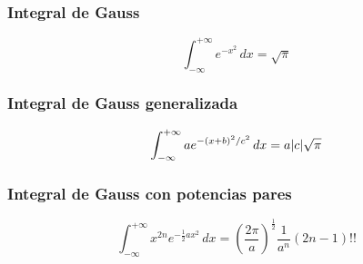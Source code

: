 \begin{summary}
    \subsubsection*{Integral de Gauss}
    \begin{equation}
        \label{eq:integral-gauss}
         \int_{-\infty}^{+\infty} e^{-x^{2}}\,dx =\sqrt{\pi}
    \end{equation}
    
    \subsubsection*{Integral de Gauss generalizada}
    \begin{equation}
        \label{eq:integral-gauss-generalizada}
         \int_{-\infty}^{+\infty} ae^{-(x+b)^{2}/c^2}\,dx =a\lvert c\rvert\sqrt{\pi}
    \end{equation}

    \subsubsection*{Integral de Gauss con potencias pares}
    \begin{equation}
        \label{eq:integral-gauss-generalizada-potencias-pares}
         \int_{-\infty}^{+\infty} x^{2n}e^{-\frac{1}{2}ax^{2}}\,dx =\left(\frac{2\pi}{a}\right)^{\frac{1}{2}}\frac{1}{a^n}(2n-1)!!
    \end{equation}

\end{summary}